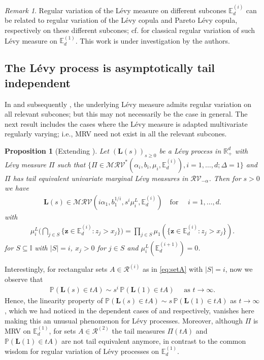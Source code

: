 \documentclass[aos]{imsart}
\numberwithin{equation}{section}
\theoremstyle{plain} %
\newtheorem{proposition}[theorem]{Proposition}
\theoremstyle{remark}
\newtheorem{remark}[theorem]{Remark}
\newcommand{\E}{\mathbb{E}}
\renewcommand\P{\mathbb{P}}
\newcommand{\R}{\mathbb{R}}
\newcommand{\VF}[1]{{\color{blue} #1}}
\def\MRV{\mathcal{MRV}}
\def\RV{\mathcal{RV}}
\def\bL{\boldsymbol L}
\def\bz{\boldsymbol z}
\begin{document}
\begin{remark}
Regular variation of the L\'evy measure on different subcones $\E_d^{(i)}$ can be related to regular variation of the L\'evy copula and Pareto L\'evy copula, respectively on these different subcones; cf. \cite{kluppelberg:resnick:2008,eder:kluppelberg:2012} for classical regular variation of such L\'evy measure on $\E_d^{(1)}$.  This work is under investigation by the authors.
\end{remark}


\subsection{The L\'evy process is asymptotically tail independent}
In  and subsequently , the underlying L\'evy measure admits regular variation on all relevant subcones; but this may not necessarily be the case in general.
The next result includes the cases where the L\'evy measure is adapted multivariate regularly varying; i.e., MRV need not exist in all the relevant subcones.

\begin{proposition}[Extending ] \label{Proposition 6.3}
Let $(\bL(s))_{s\geq 0}$ be a L\'evy process in $\R_+^d$ with
 L\'evy measure $\Pi$ such that $\{\Pi \in \MRV^*(\alpha_i,b_i,\mu_i,\E_d^{(i)}), i=1,\ldots,d; \Delta=1\}$ and $\Pi$ has tail equivalent univariate marginal L\'evy measures in $\RV_{-\alpha}$.  Then for $s>0$ we have
\begin{eqnarray*}
    \bL(s)\in \MRV(i\alpha_1,b_1^{1/i},s^i \mu_i^L,\E_d^{(i)})
    \quad \text {for } \quad i=1,\ldots,  d.
\end{eqnarray*}
with
\begin{align}\label{eq:limit:muiplusdelta1new}
    \mu_{i}^{L}\Big(\bigcap_{j\in S}\{\bz\in \E_d^{(i)}:z_j>x_j\}\Big)= \prod_{j\in S}
    \mu_1\left(\{\bz\in \E_d^{(i)}:z_j>x_j\}\right).
    \end{align}
    for $S\subseteq \mathbb{I}$ with $|S|=i$, $x_j>0$ for $j\in S$  and $\mu_{i}^{L}(\E_d^{(i+1)})=0$.
\end{proposition}
Interestingly, for rectangular sets $A\in\mathcal{R}^{(i)}$ as in \eqref{eq:setA} with $|S|=i$, now  we observe that
\begin{eqnarray} \label{eq;1*}
    \P(\bL(s)\in tA)\sim s^{i}\,\P(\bL(1)\in tA) \quad \text{ as }t\to\infty.
\end{eqnarray}
Hence, the linearity property of $\P(\bL(s)\in tA)\sim s\,\P(\bL(1)\in tA)$ as $t\to\infty$, which we had noticed in the dependent cases of 
 and  respectively,  vanishes here making this an unusual phenomenon for L\'evy processes. Moreover, although $\Pi$ is MRV on $\E_d^{(1)}$, for sets $A\in\mathcal{R}^{(2)}$ the tail measures
$\Pi(tA)$ and $\P(\bL(1)\in tA)$ are not tail equivalent anymore, in contrast to the common wisdom
for regular variation of L\'evy processes on $\E_d^{(1)}$.
\end{document}
